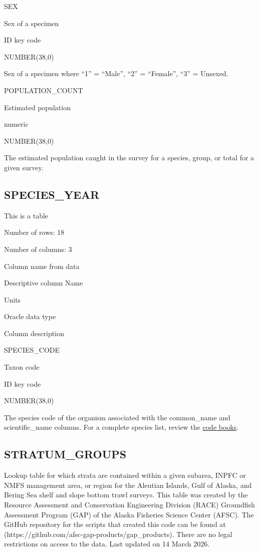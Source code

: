 \documentclass[
  letterpaper,
  oneside,
  open=any]{scrbook}
\begin{document}
SEX

Sex of a specimen

ID key code

NUMBER(38,0)

Sex of a specimen where ``1'' = ``Male'', ``2'' = ``Female'', ``3'' =
Unsexed.

POPULATION\_COUNT

Estimated population

numeric

NUMBER(38,0)

The estimated population caught in the survey for a species, group, or
total for a given survey.

\subsection{SPECIES\_YEAR}\label{species_year}

This is a table

Number of rows: 18

Number of columns: 3

Column name from data

Descriptive column Name

Units

Oracle data type

Column description

SPECIES\_CODE

Taxon code

ID key code

NUMBER(38,0)

The species code of the organism associated with the common\_name and
scientific\_name columns. For a complete species list, review the
\href{https://www.fisheries.noaa.gov/resource/document/groundfish-survey-species-code-manual-and-data-codes-manual}{code
books}.

\subsection{STRATUM\_GROUPS}\label{stratum_groups}

Lookup table for which strata are contained within a given subarea,
INPFC or NMFS management area, or region for the Aleutian Islands, Gulf
of Alaska, and Bering Sea shelf and slope bottom trawl surveys. This
table was created by the Resource Assessment and Conservation
Engineering Division (RACE) Groundfish Assessment Program (GAP) of the
Alaska Fisheries Science Center (AFSC). The GitHub repository for the
scripts that created this code can be found at
(https://github.com/afsc-gap-products/gap\_products). There are no legal
restrictions on access to the data. Last updated on 14 March 2026.
\end{document}
